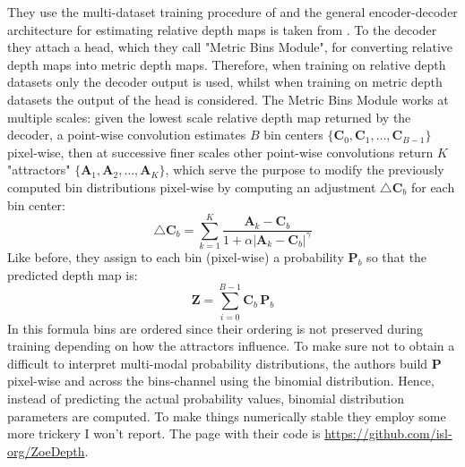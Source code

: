 They use the multi-dataset training procedure of \cite{MiDas} and the general encoder-decoder architecture for estimating relative depth maps is taken from \cite{denseViT}.
To the decoder they attach a head, which they call "Metric Bins Module", for converting relative depth maps into metric depth maps.
Therefore, when training on relative depth datasets only the decoder output is used, whilst when training on metric depth datasets the output of the head is considered.
The Metric Bins Module works at multiple scales: given the lowest scale relative depth map returned by the decoder, a point-wise convolution estimates $B$ bin centers $\{\mathbf{C}_{0}, \mathbf{C}_{1}, \dotsc, \mathbf{C}_{B-1}\}$ pixel-wise, then at successive finer scales other point-wise convolutions return $K$ "attractors" $\{\mathbf{A}_{1}, \mathbf{A}_{2}, \dotsc, \mathbf{A}_{K}\}$, which serve the purpose to modify the previously computed bin distributions pixel-wise by computing an adjustment $\triangle \mathbf{C}_{b}$ for each bin center:
\[
	\triangle \mathbf{C}_{b} = \sum_{k=1}^{K} \frac{\mathbf{A}_{k} - \mathbf{C}_{b}}{1 + \alpha | \mathbf{A}_{k} - \mathbf{C}_{b} |^{\gamma}}
\]
Like before, they assign to each bin (pixel-wise) a probability $\mathbf{P}_{b}$ so that the predicted depth map is:
\[
	\mathbf{Z} = \sum_{i=0}^{B-1} \mathbf{C}_{b} \, \mathbf{P}_{b}
\]
In this formula bins are ordered since their ordering is not preserved during training depending on how the attractors influence.
To make sure not to obtain a difficult to interpret multi-modal probability distributions, the authors build $\mathbf{P}$ pixel-wise and across the bins-channel using the binomial distribution.
Hence, instead of predicting the actual probability values, binomial distribution parameters are computed.
To make things numerically stable they employ some more trickery I won't report.
The page with their code is \url{https://github.com/isl-org/ZoeDepth}.